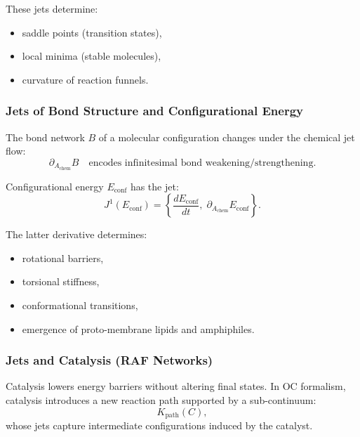These jets determine:

\begin{itemize}
    \item saddle points (transition states),
    \item local minima (stable molecules),
    \item curvature of reaction funnels.
\end{itemize}



\subsubsection{Jets of Bond Structure and Configurational Energy}

The bond network $B$ of a molecular configuration changes under the
chemical jet flow:
\[
\partial_{A_{\mathrm{chem}}} B
\quad\text{encodes infinitesimal bond weakening/strengthening.}
\]

Configurational energy $E_{\mathrm{conf}}$ has the jet:
\[
J^1(E_{\mathrm{conf}})=
\left\{
\frac{dE_{\mathrm{conf}}}{dt},\;
\partial_{A_{\mathrm{chem}}}E_{\mathrm{conf}}
\right\}.
\]

The latter derivative determines:

\begin{itemize}
    \item rotational barriers,
    \item torsional stiffness,
    \item conformational transitions,
    \item emergence of proto-membrane lipids and amphiphiles.
\end{itemize}



\subsubsection{Jets and Catalysis (RAF Networks)}

Catalysis lowers energy barriers without altering final states.
In OC formalism, catalysis introduces a new reaction path supported by a
sub-continuum:
\[
K_{\mathrm{path}}(C),
\]
whose jets capture intermediate configurations induced by the catalyst.

